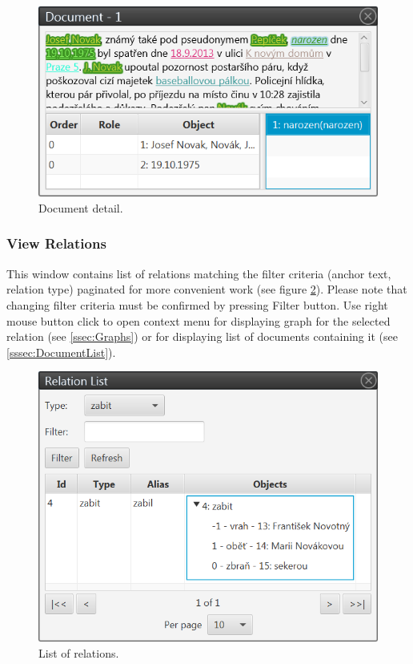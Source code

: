 \begin{figure}[!htb]
        \centering
        \includegraphics[width=\textwidth]{Images/documentview}
        \caption{Document detail.}
        \label{fig:DocumentView}
\end{figure}

\subsubsection{View Relations}

This window contains list of relations matching the filter criteria (anchor
text, relation type) paginated for more convenient work (see figure
\ref{fig:RelationList}). Please note that changing filter criteria must be
confirmed by pressing Filter button. Use right mouse button click to open
context menu for displaying graph for the selected relation (see \ref{ssec:Graphs})
or for displaying list of documents containing it (see \ref{sssec:DocumentList}).

\begin{figure}[!htb]
        \centering
        \includegraphics[width=\textwidth]{Images/relationlist}
        \caption{List of relations.}
        \label{fig:RelationList}
\end{figure}

